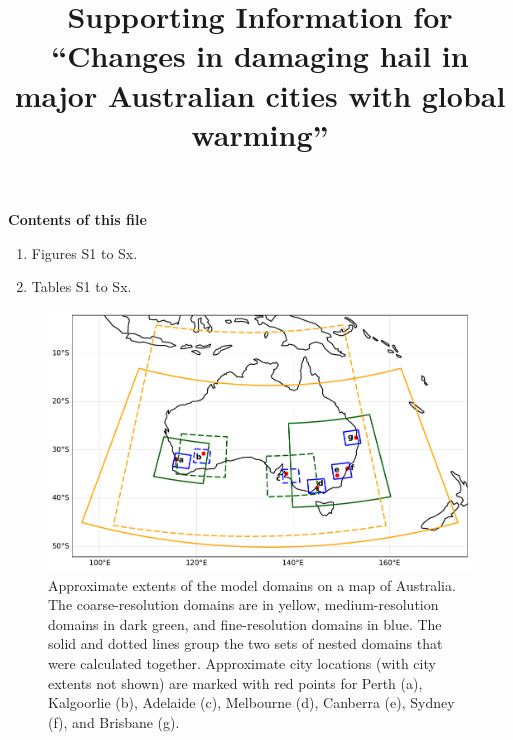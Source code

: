 \documentclass[draft,grl]{agutexSI2019}
\begin{document}
\title{Supporting Information for ``Changes in damaging hail in major Australian cities with global warming''}



\begin{article}

\noindent\textbf{Contents of this file}
\begin{enumerate}
    \item Figures S1 to Sx.
    \item Tables S1 to Sx.
\end{enumerate}

\clearpage



\end{article}


\begin{figure}[!h]
    \includegraphics[width=\textwidth]{figures/domains}
    \caption{Approximate extents of the model domains on a map of Australia. The coarse-resolution domains are in yellow, medium-resolution domains in dark green, and fine-resolution domains in blue. The solid and dotted lines group the two sets of nested domains that were calculated together. Approximate city locations (with city extents not shown) are marked with red points for Perth (a), Kalgoorlie (b), Adelaide (c), Melbourne (d), Canberra (e), Sydney (f), and Brisbane (g).}
    \label{fig:domains}
\end{figure}
\end{document}
